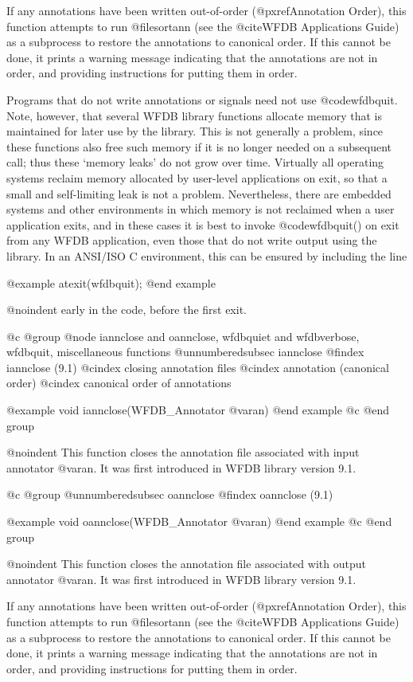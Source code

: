 {{{{{{{{If any annotations have been written out-of-order (@pxref{Annotation Order}),
this function attempts to run @file{sortann} (see the @cite{WFDB
Applications Guide}) as a subprocess to restore the annotations to canonical
order.  If this cannot be done, it prints a warning message indicating that the
annotations are not in order, and providing instructions for putting them in
order.

Programs that do not write annotations or signals need not use
@code{wfdbquit}.  Note, however, that several WFDB library functions allocate
memory that is maintained for later use by the library.  This is not generally
a problem, since these functions also free such memory if it is no longer
needed on a subsequent call;  thus these `memory leaks' do not grow over time.
Virtually all operating systems reclaim memory allocated by user-level
applications on exit, so that a small and self-limiting leak is not
a problem.  Nevertheless, there are embedded systems and other
environments in which memory is not reclaimed when a user application
exits, and in these cases it is best to invoke @code{wfdbquit()} on exit from
any WFDB application, even those that do not write output using the
library.  In an ANSI/ISO C environment, this can be ensured by
including the line

@example
	atexit(wfdbquit);
@end example

@noindent
early in the code, before the first exit.


@c @group
@node     iannclose and oannclose, wfdbquiet and wfdbverbose, wfdbquit, miscellaneous functions
@unnumberedsubsec iannclose
@findex iannclose (9.1)
@cindex closing annotation files
@cindex annotation (canonical order)
@cindex canonical order of annotations

@example
void iannclose(WFDB_Annotator @var{an})
@end example
@c @end group

@noindent
This function closes the annotation file associated with input annotator
@var{an}.  It was first introduced in WFDB library version 9.1.

@c @group
@unnumberedsubsec oannclose
@findex oannclose (9.1)

@example
void oannclose(WFDB_Annotator @var{an})
@end example
@c @end group

@noindent
This function closes the annotation file associated with output
annotator @var{an}.  It was first introduced in WFDB library version 9.1.

If any annotations have been written out-of-order (@pxref{Annotation Order}),
this function attempts to run @file{sortann} (see the @cite{WFDB
Applications Guide}) as a subprocess to restore the annotations to canonical
order.  If this cannot be done, it prints a warning message indicating that the
annotations are not in order, and providing instructions for putting them in
order.

}}}}}}}}
